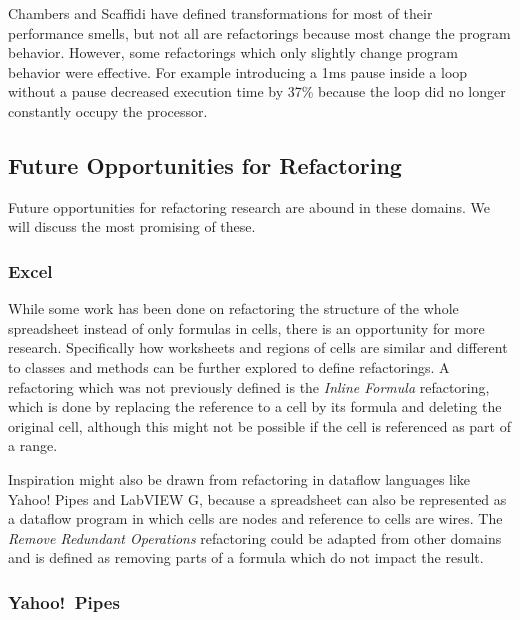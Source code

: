 \documentclass[10pt,conference,compsocconf]{IEEEtran}
\begin{document}
Chambers and Scaffidi \cite{chambers2015impact} have defined transformations for most of their performance smells, but not all are refactorings because most change the program behavior.
However, some refactorings which only slightly change program behavior were effective.
For example introducing a 1ms pause inside a loop without a pause decreased execution time by 37\% because the loop did no longer constantly occupy the processor.

\subsection{Future Opportunities for Refactoring}

Future opportunities for refactoring research are abound in these domains.
We will discuss the most promising of these.

\subsubsection{Excel}

While some work has been done on refactoring the structure of the whole spreadsheet instead of only formulas in cells, there is an opportunity for more research. 
Specifically how worksheets and regions of cells are similar and different to classes and methods can be further explored to define refactorings.
A refactoring which was not previously defined is the \emph{Inline Formula} refactoring, which is done by replacing the reference to a cell by its formula and deleting the original cell, although this might not be possible if the cell is referenced as part of a range.


Inspiration might also be drawn from refactoring in dataflow languages like Yahoo! Pipes and LabVIEW G, because a spreadsheet can also be represented as a dataflow program in which cells are nodes and reference to cells are wires.
The \emph{Remove Redundant Operations} refactoring could be adapted from other domains and is defined as removing parts of a formula which do not impact the result.


\subsubsection{Yahoo!\ Pipes}
\end{document}

